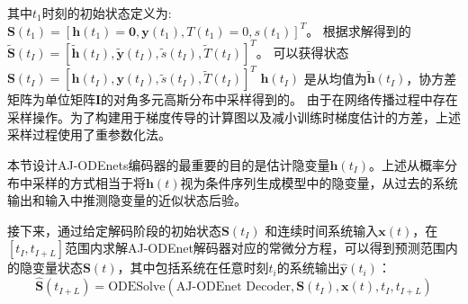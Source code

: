 其中$t_1$时刻的初始状态定义为:
$
\boldsymbol S(t_1)=\left[\boldsymbol h(t_1) = \boldsymbol 0,\boldsymbol y(t_1),T(t_1)=0,s(t_1)\right ]^T
$。 
根据求解得到的
$\boldsymbol{\tilde{S}}(t_I)=[\boldsymbol{\tilde h}(t_I), \boldsymbol{\tilde y}(t_I), \tilde s(t_I), \tilde T(t_I)]^T$。
可以获得状态$\boldsymbol{S}(t_I)=[\boldsymbol{h}(t_I), \boldsymbol{y}(t_I), \tilde s(t_I), \tilde T(t_I)]^T$
$\boldsymbol{h}(t_I)$ 是从均值为$\boldsymbol{\tilde h}(t_I)$，协方差矩阵为单位矩阵$\boldsymbol I$的对角多元高斯分布中采样得到的。
由于在网络传播过程中存在采样操作。为了构建用于梯度传导的计算图以及减小训练时梯度估计的方差，上述采样过程使用了重参数化法\cite{kingma2013auto}。

本节设计AJ-ODEnets编码器的最重要的目的是估计隐变量$\boldsymbol h(t_I)$。上述从概率分布中采样的方式相当于将$\boldsymbol h(t)$视为条件序列生成模型中的隐变量，从过去的系统输出和输入中推测隐变量的近似状态后验\cite{10.5555/3454287.3454765,Hafner2019}。

接下来，通过给定解码阶段的初始状态$\boldsymbol S(t_I)$ 和连续时间系统输入$\boldsymbol x(t)$，在$[t_I, t_{I+L}]$范围内求解AJ-ODEnet解码器对应的常微分方程，可以得到预测范围内的隐变量状态$\boldsymbol S(t)$，其中包括系统在任意时刻$t_i$的系统输出$\boldsymbol{\hat{y}}(t_i)$：
\begin{equation}
\boldsymbol {\hat S}(t_{I+L})=\text{ODESolve}(\text{AJ-ODEnet Decoder},\boldsymbol S(t_I)
, \boldsymbol {x}(t), t_I, t_{I+L})
\label{equ:decoding}
\end{equation}


